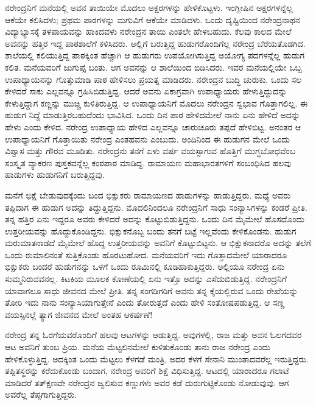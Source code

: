 ನರೇಂದ್ರನಿಗೆ ಮನೆಯಲ್ಲಿ ಅವನ ತಾಯಿಯೇ ಮೊದಲು ಅಕ್ಷರಗಳನ್ನು ಹೇಳಿಕೊಟ್ಟಳು. ಇಂಗ್ಲೀಷಿನ ಅಕ್ಷರಗಳನ್ನೆಲ್ಲ ಆಕೆಯೇ ಕಲಿಸಿದಳು; ಪ್ರಥಮ ಪಾಠಗಳನ್ನು ಮಗುವಿಗೆ ಆಕೆಯೇ ಮಾಡಿದಳು. ಒಂದು ದೃಷ್ಟಿಯಿಂದ ನರೇಂದ್ರನಾಥನ ವಿದ್ಯಾಭ್ಯಾಸಕ್ಕೆ ತಳಪಾಯವನ್ನು ಹಾಕಿದವಳು ನರೇಂದ್ರನ ತಾಯಿ ಎಂತಲೇ ಹೇಳಬಹುದು. ಕೆಲವು ಕಾಲದ ಮೇಲೆ ಅವನನ್ನು ಹತ್ತಿರ ಇದ್ದ ಪಾಠಶಾಲೆಗೆ ಕಳಿಸಿದರು. ಅಲ್ಲಿಗೆ ಬರುತ್ತಿದ್ದ ಹುಡುಗರೊಂದಿಗೆಲ್ಲ ನರೇಂದ್ರ ಬೆರೆಯತೊಡಗಿದ. ಶಾಲೆಯಲ್ಲಿ ಕಲಿಯುತ್ತಿದ್ದ ಪಾಠಕ್ಕಿಂತ ಹೆಚ್ಚಾಗಿ ಆ ಹುಡುಗರು ಉಪಯೋಗಿಸುತ್ತಿದ್ದ ಅಯೋಗ್ಯ ಪದಗಳನ್ನೆಲ್ಲ ಹುಡುಗ ಕಲಿತ. ಮನೆಯವರಿಗೆ ಜುಗುಪ್ಸೆ ಬಂತು. ಆಗ ಅವನನ್ನು ಆ ಶಾಲೆಯಿಂದ ಬಿಡಿಸಿದರು. ಇವರ ಮನೆಯಲ್ಲಿಯೇ ಒಬ್ಬ ಉಪಾಧ್ಯಾಯನನ್ನು ಗೊತ್ತುಮಾಡಿ ಪಾಠ ಹೇಳಿಸಲು ಪ್ರಯತ್ನ ಮಾಡಿದರು. ನರೇಂದ್ರನ ಬುದ್ಧಿ ಚುರುಕು. ಒಂದು ಸಲ ಕೇಳಿದರೆ ಸಾಕು ಎಲ್ಲವನ್ನೂ ಗ್ರಹಿಸಿಬಿಡುತ್ತಿದ್ದ. ಆದರೆ ಅವನು ಏಕಾಗ್ರವಾಗಿ ಉಪಾಧ್ಯಾಯರು ಹೇಳುತ್ತಿದ್ದುದನ್ನು ಕೇಳುತ್ತಿದ್ದಾಗ ಕಣ್ಣನ್ನು ಮುಚ್ಚಿ ಕುಳಿತಿರುತ್ತಿದ್ದ. ಆ ಉಪಾಧ್ಯಾಯನಿಗೆ ಮೊದಲು ನರೇಂದ್ರನ ಸ್ವಭಾವ ಗೊತ್ತಾಗಲಿಲ್ಲ. ಈ ಹುಡುಗ ನಿದ್ದೆ ಮಾಡುತ್ತಿರಬಹುದೆಂದು ಭಾವಿಸಿದ. ಒಂದು ದಿನ ಪಾಠ ಹೇಳಿದಮೇಲೆ ನಾನು ಏನು ಹೇಳಿದೆ ಅದನ್ನು ಹೇಳು ಎಂದು ಕೇಳಿದ. ನರೇಂದ್ರ ಉಪಾಧ್ಯಾಯ ಹೇಳಿದ ಎಲ್ಲವನ್ನೂ ಚಾರುಚೂರು ತಪ್ಪದೆ ಹೇಳಿಬಿಟ್ಟ. ಅನಂತರ ಆ ಉಪಾಧ್ಯಾಯನಿಗೆ ಗೊತ್ತಾಯಿತು ನರೇಂದ್ರ ಎಂತಹವನು ಎಂಬುದು. ಅಂದಿನಿಂದ ಈ ಹುಡುಗನ ಮೇಲೆ ಒಂದು ವಿಶ್ವಾಸ ಮತ್ತು ಗೌರವ ಮೂಡಿತು. ನರೇಂದ್ರನು ತನಗೆ ಏಳು ವರ್ಷ ವಯಸ್ಸಾಗುವ ಹೊತ್ತಿಗೆ ಮುಗ್ಧಬೋಧವೆಂಬ ಸಂಸ್ಕೃತ ವ್ಯಾಕರಣ ಪುಸ್ತಕವನ್ನೆಲ್ಲ ಕಂಠಪಾಠ ಮಾಡಿದ್ದ. ರಾಮಾಯಣ ಮಹಾಭಾರತಗಳಿಗೆ ಸಂಬಂಧಿಸಿದ ಹಲವು ಹಾಡುಗಳು ಹುಡುಗನಿಗೆ ಬರುತ್ತಿದ್ದವು. 

ಮನೆಗೆ ಭಿಕ್ಷೆ ಬೇಡುವುದಕ್ಕೆಂದು ಬಂದ ಭಿಕ್ಷುಕರು ರಾಮಾಯಣದ ಹಾಡುಗಳನ್ನು ಹಾಡುತ್ತಿದ್ದರು. ಮಧ್ಯೆ ಅವರು ತಪ್ಪಿದಾಗ ಈ ಹುಡುಗ ಅದನ್ನು ತಿದ್ದುತ್ತಿದ್ದನು. ಮೊದಲಿನಿಂದಲೂ ನರೇಂದ್ರನಿಗೆ ಸಾಧು ಸಂನ್ಯಾಸಿಗಳನ್ನು ಕಂಡರೆ ಪ್ರೀತಿ. ತನ್ನ ಹತ್ತಿರ ಏನು ಇದ್ದರೂ ಅವರು ಕೇಳಿದರೆ ಅದನ್ನು ಕೊಟ್ಟುಬಿಡುತ್ತಿದ್ದನು. ಒಂದು ದಿನ ಮೈಮೇಲೆ ಹೊಸದೊಂದು ಉತ್ತರೀಯವನ್ನು ಹೊದ್ದುಕೊಂಡಿದ್ದನು. ಭಿಕ್ಷುಕನೊಬ್ಬ ಬಂದು ತನಗೆ ಬಟ್ಟೆ ಇಲ್ಲವೆಂದು ಕೇಳಿಕೊಂಡನು. ಹುಡುಗ ಮರುಮಾತನಾಡದೆ ಮೈಮೇಲೆ ಹೊದ್ದ ಉತ್ತರೀಯವನ್ನು ಅವನಿಗೆ ಕೊಟ್ಟುಬಿಟ್ಟನು. ಆ ಭಿಕ್ಷುಕನಾದರೊ ಅದನ್ನು ತಲೆಗೆ ಒಂದು ರುಮಾಲಿನಂತೆ ಸುತ್ತಿಕೊಂಡು ಹೊರಟುಹೋದ. ಮನೆಯವರಿಗೆ ಇದು ಗೊತ್ತಾದಮೇಲೆ ಯಾರಾದರೂ ಭಿಕ್ಷುಕರು ಬಂದರೆ ಹುಡುಗನನ್ನು ಒಳಗೆ ಒಂದು ರೂಮಿನಲ್ಲಿ ಕೂಡಿಹಾಕುತ್ತಿದ್ದರು. ಅಲ್ಲಿಯೂ ನರೇಂದ್ರ ಏನು ಸುಮ್ಮನಿರುವವನಲ್ಲ. ಕಿಟಕಿಯ ಮೂಲಕ ಕೋಣೆಯಲ್ಲಿ ಏನು ಇತ್ತೊ ಅದನ್ನು ಎಸೆದುಬಿಡುತ್ತಿದ್ದ. ನರೇಂದ್ರನಿಗೆ ಯಾವಾಗಲೂ ಸಾಧು ಜೀವನದ ಮೇಲೆ ಪ್ರೀತಿ. ತನ್ನ ಸಂಗಡಿಗರಿಗೆ ಅವನು ತನ್ನ ಕೈಯಲ್ಲಿರುವ ಒಂದು ರೇಖೆಯನ್ನು ತೋರಿ ಇದು ನಾನು ಸಂನ್ಯಾಸಿಯಾಗುತ್ತೇನೆ ಎಂದು ತೋರುತ್ತದೆ ಎಂದು ಹೇಳಿ ಸಂತೋಷಪಡುತ್ತಿದ್ದ. ಆ ಸಣ್ಣ ವಯಸ್ಸಿನಲ್ಲೆ ತ್ಯಾಗ ಜೀವನದ ಮೇಲೆ ಅಂತಹ ಆಕರ್ಷಣೆ! 

ನರೇಂದ್ರ ತನ್ನ ಓರಗೆಯವರೊಂದಿಗೆ ಹಲವು ಆಟಗಳನ್ನು ಆಡುತ್ತಿದ್ದ. ಅವುಗಳಲ್ಲಿ, ರಾಜ ಮತ್ತು ಅವನ ಓಲಗದವರ ಆಟ ಅವನಿಗೆ ತುಂಬ ಪ್ರಿಯ. ಮನೆಯ ಮೆಟ್ಟಲಿನಮೇಲೆ ಕುಳಿತುಕೊಂಡು ತಾನು ರಾಜ ನರೇಂದ್ರ ಎಂದು ಹೇಳಿಕೊಳ್ಳುತ್ತಿದ್ದ. ಅದಕ್ಕಿಂತ ಒಂದು ಮೆಟ್ಟಲು ಕೆಳಗಡೆ ಮಂತ್ರಿ, ಅದರ ಕೆಳಗೆ ಸೇನಾನಿ ಮುಂತಾದವರೆಲ್ಲ ಇರುತ್ತಿದ್ದರು. ತಪ್ಪಿತಸ್ಥರನ್ನು ಕರೆದುಕೊಂಡು ಬಂದಾಗ, ನರೇಂದ್ರ ಅವರಿಗೆ ಶಿಕ್ಷೆ ವಿಧಿಸುತ್ತಿದ್ದ. ಆಟದಲ್ಲಿ ಯಾರಾದರೂ ಗಲಾಟೆ ಮಾಡಿದರೆ ತತ್‍ಕ್ಷಣವೇ ನರೇಂದ್ರನ ಜ್ವಲಿಸುವ ಕಣ್ಣುಗಳು ಅವರ ಕಡೆ ದುರುಗುಟ್ಟಿಕೊಂಡು ನೋಡುವುವು. ಆಗ ಅವರೆಲ್ಲ ತೆಪ್ಪಗಾಗುತ್ತಿದ್ದರು. 


